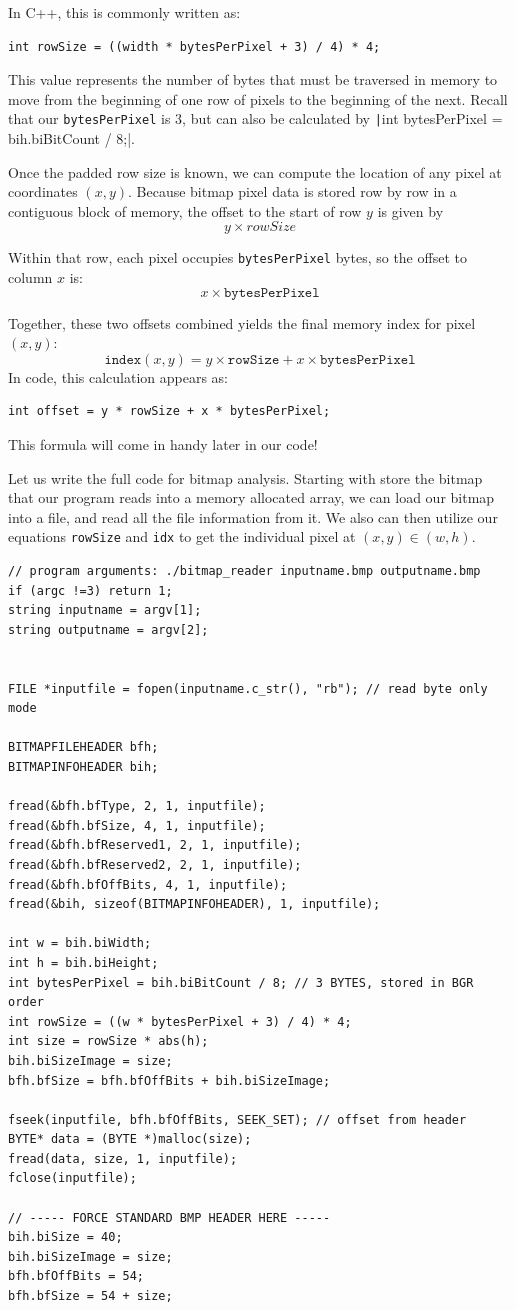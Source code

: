 In C++, this is commonly written as:
\begin{verbatim}
int rowSize = ((width * bytesPerPixel + 3) / 4) * 4;
\end{verbatim}

This value represents the number of bytes that must be traversed in memory to move from the beginning of one row of pixels to the beginning of the next. Recall that our \texttt{bytesPerPixel} is $3$, but can also be calculated by \texttt|int bytesPerPixel = bih.biBitCount / 8;|.

Once the padded row size is known, we can compute the location of any pixel at coordinates $(x, y)$. Because bitmap pixel data is stored row by row in a contiguous block of memory, the offset to the start of row $y$ is given by
$$y \times rowSize$$

Within that row, each pixel occupies \texttt{bytesPerPixel} bytes, so the offset to column $x$ is:
$$x \times \texttt{bytesPerPixel}$$

Together, these two offsets combined yields the final memory index for pixel $(x, y)$:
$$\texttt{index}(x,y) = y \times \texttt{rowSize} + x \times \texttt{bytesPerPixel}$$
In code, this calculation appears as:
\begin{verbatim}
int offset = y * rowSize + x * bytesPerPixel;
\end{verbatim}
This formula will come in handy later in our code!

Let us write the full code for bitmap analysis. Starting with store the bitmap that our program reads into a memory allocated array, we can load our bitmap into a file, and read all the file information from it. We also can then utilize our equations \texttt{rowSize} and \texttt{idx} to get the individual pixel at $(x,y) \in (w,h)$. 
\begin{verbatim}
// program arguments: ./bitmap_reader inputname.bmp outputname.bmp
if (argc !=3) return 1;
string inputname = argv[1];
string outputname = argv[2];


FILE *inputfile = fopen(inputname.c_str(), "rb"); // read byte only mode

BITMAPFILEHEADER bfh;
BITMAPINFOHEADER bih;

fread(&bfh.bfType, 2, 1, inputfile);
fread(&bfh.bfSize, 4, 1, inputfile);
fread(&bfh.bfReserved1, 2, 1, inputfile);
fread(&bfh.bfReserved2, 2, 1, inputfile);
fread(&bfh.bfOffBits, 4, 1, inputfile);
fread(&bih, sizeof(BITMAPINFOHEADER), 1, inputfile);

int w = bih.biWidth;
int h = bih.biHeight;
int bytesPerPixel = bih.biBitCount / 8; // 3 BYTES, stored in BGR order
int rowSize = ((w * bytesPerPixel + 3) / 4) * 4;
int size = rowSize * abs(h);
bih.biSizeImage = size;
bfh.bfSize = bfh.bfOffBits + bih.biSizeImage;

fseek(inputfile, bfh.bfOffBits, SEEK_SET); // offset from header
BYTE* data = (BYTE *)malloc(size);
fread(data, size, 1, inputfile);
fclose(inputfile);

// ----- FORCE STANDARD BMP HEADER HERE -----
bih.biSize = 40;
bih.biSizeImage = size;
bfh.bfOffBits = 54;
bfh.bfSize = 54 + size;
\end{verbatim}

